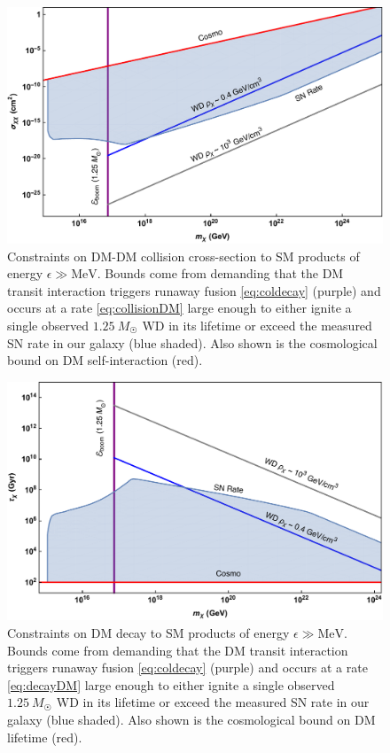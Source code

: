 \documentclass[twocolumn, preprintnumbers,amsmath,amssymb,prd, superscriptaddress]{revtex4}
\newcommand{\MeV}{\text{MeV}}
\begin{document}
\begin{figure}
\includegraphics[scale=.35]{collisionobservation.pdf}
\caption{Constraints on DM-DM collision cross-section to SM products of energy $\epsilon \gg \MeV$.
Bounds come from demanding that the DM transit interaction triggers runaway fusion \eqref{eq:coldecay} (purple) and occurs at a rate \eqref{eq:collisionDM} large enough to either ignite a single observed $1.25~M_{\astrosun}$ WD in its lifetime or exceed the measured SN rate in our galaxy (blue shaded).
Also shown is the cosmological bound on DM self-interaction (red).}
\label{fig:transit-collision}
\end{figure}

\begin{figure}
\includegraphics[scale=.35]{decayobservation.pdf}
\caption{Constraints on DM decay to SM products of energy $\epsilon \gg \MeV$.
Bounds come from demanding that the DM transit interaction triggers runaway fusion \eqref{eq:coldecay} (purple) and occurs at a rate \eqref{eq:decayDM} large enough to either ignite a single observed $1.25~M_{\astrosun}$ WD in its lifetime or exceed the measured SN rate in our galaxy (blue shaded).
Also shown is the cosmological bound on DM lifetime (red).}
\label{fig:transit-decay}
\end{figure}
\end{document}
